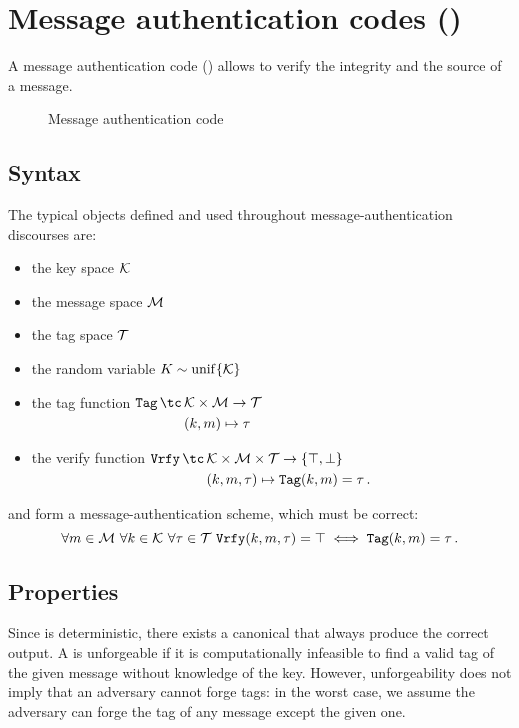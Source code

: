 
\section{Message authentication codes (\Mac)}
A message authentication code (\Mac) allows to verify the integrity and the source of a message.

\begin{figure}[h]
	\centering
	
	\caption{Message authentication code}
\end{figure}


\subsection{Syntax}
The typical objects defined and used throughout message-authentication discourses are:
%
\begin{itemize}[parsep=0pt]
	\item the key space $\mathcal{K}$
%
	\item the message space $\mathcal{M}$
%
	\item the tag space $\mathcal{T}$
%
	\item the random variable $K \sim \operatorname{unif}\{\mathcal{K}\}$
%
    \item the tag function $\begin{aligned}[t]\Tag \, \tc \, & \K \times \M \to \Tau \\ & (k, m) \mapsto \tau\end{aligned}$
    \item the verify function $\begin{aligned}[t]\Vrfy \, \tc \, & \K \times \M \times \Tau \to \BoolSym \\ & (k, m, \tau) \mapsto \Tag(k, m) = \tau \, .\end{aligned}$
\end{itemize}
%
\Tag{} and \Vrfy{} form a message-authentication scheme, which must be correct:
\[
	\forall m \in \M \ \forall k \in \K \ \forall \tau \in \Tau \ \Vrfy(k, m, \tau) = \top \iff \Tag(k, m) = \tau \, .
\]


\subsection{Properties}
Since \Tag{} is deterministic, there exists a canonical \Vrfy{} that always produce the correct output.
A \Mac{} is unforgeable if it is computationally infeasible to find a valid tag of the given message without knowledge of the key.
However, unforgeability does not imply that an adversary cannot forge tags: in the worst case, we assume the adversary can forge the tag of any message except the given one.

